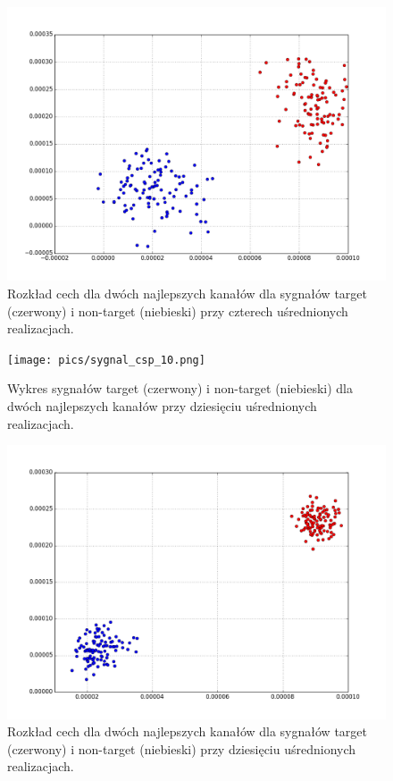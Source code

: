 \documentclass[licencjacka,openright]{pracamgr}
\begin{document}
\begin{figure}[H]
\centering
\includegraphics[scale=0.55, trim=0mm 0mm 0mm 0mm, clip=True]{pics/cecha_csp_4.png}
\caption{Rozkład cech dla dwóch najlepszych kanałów dla sygnałów target (czerwony) i non-target (niebieski) przy czterech uśrednionych realizacjach.}
\label{cecha_csp_4}
\end{figure}

\begin{figure}[H]
\centering
\texttt{[image: pics/sygnal\_csp\_10.png]}
\caption{Wykres sygnałów target (czerwony) i non-target (niebieski) dla dwóch najlepszych kanałów przy dziesięciu uśrednionych realizacjach.}
\label{sygnal_csp_10}
\end{figure}

\begin{figure}[H]
\centering
\includegraphics[scale=0.55, trim=0mm 0mm 0mm 0mm, clip=True]{pics/cecha_csp_10.png}
\caption{Rozkład cech dla dwóch najlepszych kanałów dla sygnałów target (czerwony) i non-target (niebieski) przy dziesięciu uśrednionych realizacjach.}
\label{cecha_csp_10}
\end{figure}
\end{document}
